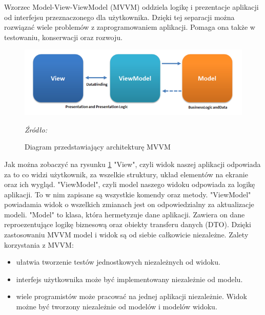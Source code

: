 \documentclass[12pt,oneside]{report}
\begin{document}
Wzorzec Model-View-ViewModel (MVVM) oddziela logikę i prezentacje aplikacji od interfejsu przeznaczonego dla użytkownika. Dzięki tej separacji można rozwiązać wiele problemów z zaprogramowaniem aplikacji. Pomaga ona także w testowaniu, konserwacji oraz rozwoju.\cite{MVVMmicLearn}
\begin{figure}[H]
	\centering
	\includegraphics[scale=0.6]{MVVMPattern}
	\caption{Diagram przedstawiający architekturę MVVM }
	\textit{Źródło: \cite{mvvmpattern}}
	\label{MVVM}
\end{figure}
Jak można zobaczyć na rysunku \ref{MVVM} "View", czyli widok naszej aplikacji odpowiada za to co widzi użytkownik, za wszelkie struktury, układ elementów na ekranie oraz ich wygląd. "ViewModel", czyli model naszego widoku odpowiada za logikę aplikacji. To w nim zapisane są wszystkie komendy oraz metody. "ViewModel" powiadamia widok o wszelkich zmianach jest on odpowiedzialny za aktualizacje modeli. "Model" to klasa, która hermetyzuje dane aplikacji. Zawiera on dane reproezentujące logikę biznesową oraz obiekty transferu danych (DTO). Dzięki zastosowaniu MVVM model i widok są od siebie całkowicie niezależne. \cite{MVVMmicLearn}
Zalety korzystania z MVVM:
\begin{itemize}
	\item ułatwia tworzenie testów jednostkowych niezależnych od widoku. 
	\item interfejs użytkownika może być implementowany niezależnie od modelu. 
	\item wiele programistów może pracować na jednej aplikacji niezależnie. Widok możne być tworzony niezależnie od modelów i modelów widoku.
\end{itemize}
\end{document}

